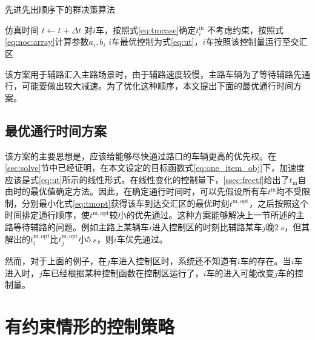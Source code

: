 \begin{algorithm}
\caption{先进先出顺序下的群决策算法}
\label{alg:fifo}
\begin{algorithmic}
  \Statex
    \State 仿真时间 $t\gets t+\Delta t$
        \State 对$i$车，按照式\ref{eq:tmcase}确定$t_i^\mathrm{m}$
        \State 不考虑约束，按照式\ref{eq:noc:array}计算参数$a_i, b_i$
        \State $i$车最优控制为式\ref{eq:ut}，$i$车按照该控制量运行至交汇区
      \EndFor
    \EndIf
  \EndWhile
\end{algorithmic}
\end{algorithm}

该方案用于辅路汇入主路场景时，由于辅路速度较慢，主路车辆为了等待辅路先通行，可能要做出较大减速。为了优化这种顺序，本文提出下面的最优通行时间方案。

\subsection{最优通行时间方案}
该方案的主要思想是，应该给能够尽快通过路口的车辆更高的优先权。在\ref{sec:solve}节中已经证明，在本文设定的目标函数式\ref{eq:one_item_obj}下，加速度应该是式\ref{eq:ut}所示的线性形式。在线性变化的控制量下，\ref{ssec:freetf}给出了$t_\mathrm{m}$自由时的最优值确定方法。因此，在确定通行时间时，可以先假设所有车$t^\mathrm{m}$均不受限制，分别最小化式\ref{eq:tmopt}获得该车到达交汇区的最优时刻$t^\mathrm{m,opt}$，之后按照这个时间排定通行顺序，使$t^\mathrm{m,opt}$较小的优先通过。这种方案能够解决上一节所述的主路等待辅路的问题。例如主路上某辆车$i$进入控制区的时刻比辅路某车$j$晚$\SI{2}{s}$，但其解出的$t_i^\mathrm{m,opt}$比$t_j^\mathrm{m,opt}$小$\SI{5}{s}$，则$i$车优先通过。

然而，对于上面的例子，在$j$车进入控制区时，系统还不知道有$i$车的存在。当$i$车进入时，$j$车已经根据某种控制函数在控制区运行了，$i$车的进入可能改变$j$车的控制量。

\section{有约束情形的控制策略}


